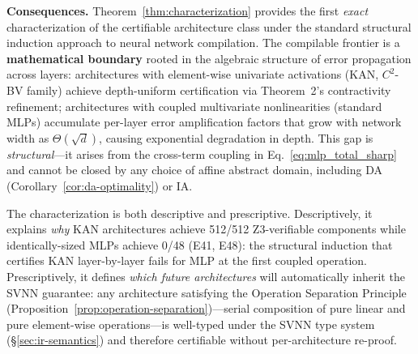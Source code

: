 \vspace{4pt}
\noindent\textbf{Consequences.}
Theorem~\ref{thm:characterization} provides the first
\textit{exact} characterization of the certifiable architecture class
under the standard structural induction approach to neural network
compilation. The compilable frontier is a \textbf{mathematical boundary}
rooted in the algebraic structure of error propagation across layers:
architectures with element-wise univariate activations (KAN,
$C^2$-BV family) achieve depth-uniform certification via Theorem~2's
contractivity refinement; architectures with coupled multivariate
nonlinearities (standard MLPs) accumulate per-layer error amplification
factors that grow with network width as $\Theta(\sqrt{d})$, causing
exponential degradation in depth. This gap is \textit{structural}---it
arises from the cross-term coupling in Eq.~\ref{eq:mlp_total_sharp} and
cannot be closed by any choice of affine abstract domain, including DA
(Corollary~\ref{cor:da-optimality}) or IA.

The characterization is both descriptive and prescriptive.
Descriptively, it explains \textit{why} KAN architectures achieve
512/512 Z3-verifiable components while identically-sized MLPs achieve
0/48 (E41, E48): the structural induction that certifies KAN layer-by-layer
fails for MLP at the first coupled operation. Prescriptively, it defines
\textit{which future architectures} will automatically inherit the SVNN
guarantee: any architecture satisfying the Operation Separation Principle
(Proposition~\ref{prop:operation-separation})---serial composition of pure
linear and pure element-wise operations---is well-typed under the SVNN
type system ({\S}\ref{sec:ir-semantics}) and therefore certifiable without
per-architecture re-proof.
